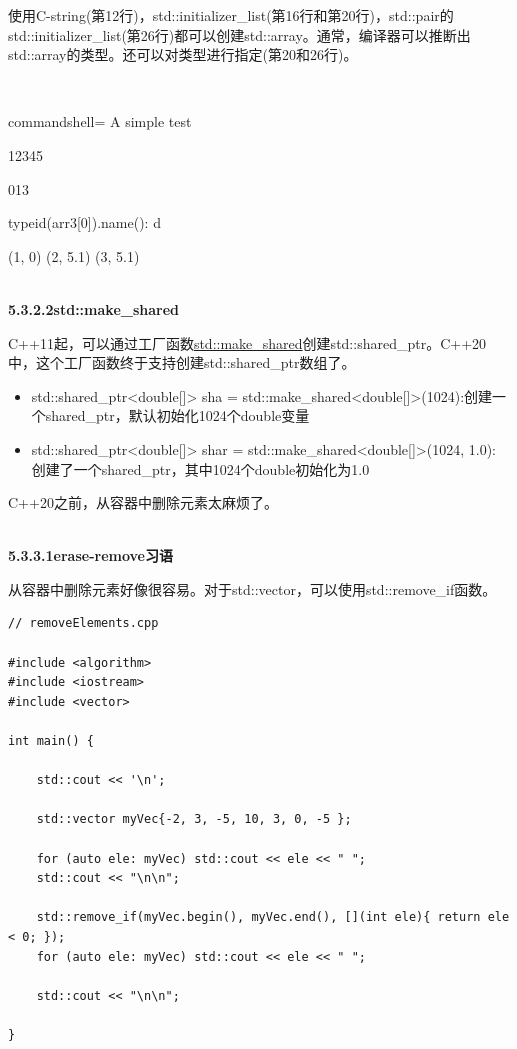 使用C-string(第12行)，std::initializer\_list(第16行和第20行)，std::pair的std::initializer\_list(第26行)都可以创建std::array。通常，编译器可以推断出std::array的类型。还可以对类型进行指定(第20和26行)。

\hspace*{\fill} \\ %
\begin{tcblisting}{commandshell={}}
A simple test

12345

013

typeid(arr3[0]).name(): d

(1, 0)
(2, 5.1)
(3, 5.1)
\end{tcblisting}

\hspace*{\fill} \\ %
\noindent
\textbf{5.3.2.2\hspace{0.2cm}std::make\_shared}

C++11起，可以通过工厂函数\href{https://en.cppreference.com/w/cpp/memory/shared_ptr/make_shared}{std::make\_shared}创建std::shared\_ptr。C++20中，这个工厂函数终于支持创建std::shared\_ptr数组了。

\begin{itemize}
\item 
std::shared\_ptr<double[]> sha = std::make\_shared<double[]>(1024):创建一个shared\_ptr，默认初始化1024个double变量

\item 
std::shared\_ptr<double[]> shar = std::make\_shared<double[]>(1024, 1.0): 创建了一个shared\_ptr，其中1024个double初始化为1.0
\end{itemize}


C++20之前，从容器中删除元素太麻烦了。

\hspace*{\fill} \\ %
\noindent
\textbf{5.3.3.1\hspace{0.2cm}erase-remove习语}

从容器中删除元素好像很容易。对于std::vector，可以使用std::remove\_if函数。

\begin{lstlisting}[style=styleCXX]
// removeElements.cpp

#include <algorithm>
#include <iostream>
#include <vector>

int main() {

	std::cout << '\n';
	
	std::vector myVec{-2, 3, -5, 10, 3, 0, -5 };
	
	for (auto ele: myVec) std::cout << ele << " ";
	std::cout << "\n\n";
	
	std::remove_if(myVec.begin(), myVec.end(), [](int ele){ return ele < 0; });
	for (auto ele: myVec) std::cout << ele << " ";
	
	std::cout << "\n\n";

}
\end{lstlisting}

